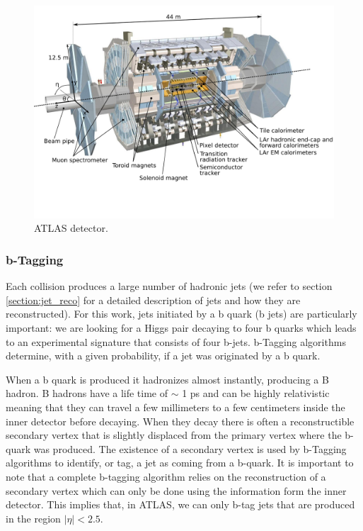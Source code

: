 \begin{figure}
	\centering
	\includegraphics[trim={0cm 3.5cm 0cm 0},clip,width=\textwidth]{./Figures/ATLASsvg3.png}
	\caption{ATLAS detector.}
	\label{fig:ATLAS_detector}
\end{figure} 

\subsubsection{b-Tagging}

Each collision produces a large number of hadronic jets (we refer to section \ref{section:jet_reco} for a detailed description of jets and how they are reconstructed). For this work, jets initiated by a b quark (b jets) are particularly important: we are looking for a Higgs pair decaying to four b quarks which leads to an experimental signature that consists of four b-jets. b-Tagging algorithms determine, with a given probability, if a jet was originated by a b quark. 

When a b quark is produced it hadronizes almost instantly, producing a B hadron. B hadrons have a life time of $\sim$ 1 ps and can be highly relativistic meaning that they can travel a few millimeters to a few centimeters inside the inner detector before decaying. When they decay there is often a reconstructible secondary vertex that is slightly displaced from the primary vertex where the b-quark was produced. The existence of a secondary vertex is used by b-Tagging algorithms to identify, or tag, a jet as coming from a b-quark. It is important to note that a complete b-tagging algorithm relies on the reconstruction of a secondary vertex which can only be done using the information form the inner detector. This implies that, in ATLAS, we can only b-tag jets that are produced in the region $|\eta|<2.5$.

